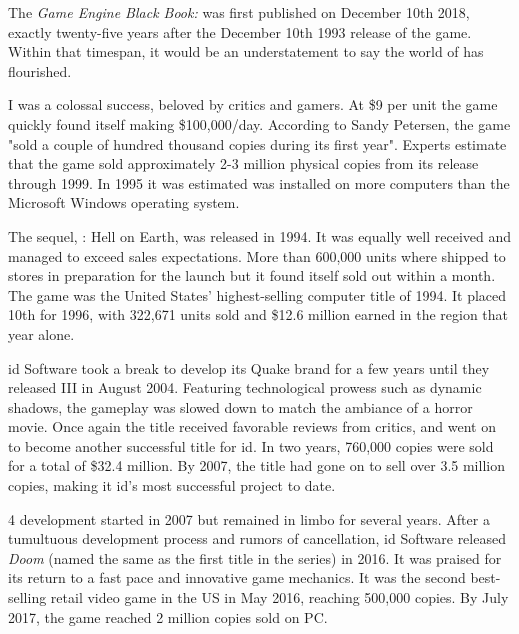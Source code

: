 The \textit{Game Engine Black Book: \doom{}} was first published on December 10th 2018, exactly twenty-five years after the December 10th 1993 release of the game. Within that timespan, it would be an understatement to say the world of \doom{} has flourished.\\
\par
\doom{} I was a colossal success, beloved by critics and gamers. At \$9 per unit the game quickly found itself making \$100,000/day. According to Sandy Petersen, the game "sold a couple of hundred thousand copies during its first year". Experts estimate that the game sold approximately 2-3 million physical copies from its release through 1999. In 1995 it was estimated \doom{} was installed on more computers than the Microsoft Windows operating system.\\
\par
The sequel, \doomii{}: Hell on Earth, was released in 1994. It was equally well received and managed to exceed sales expectations. More than 600,000 units where shipped to stores in preparation for the launch but it found itself sold out within a month. The game was the United States' highest-selling computer title of 1994. It placed 10th for 1996, with 322,671 units sold and \$12.6 million earned in the region that year alone.\\
\par
id Software took a break to develop its Quake brand for a few years until they released \doom{} III in August 2004. Featuring technological prowess such as dynamic shadows, the gameplay was slowed down to match the ambiance of a horror movie. Once again the title received favorable reviews from critics, and went on to become another successful title for id. In two years, 760,000 copies were sold for a total of \$32.4 million.  By 2007, the title had gone on to sell over 3.5 million copies, making it id's most successful project to date.\\
\par
 \doom{} 4 development started in 2007 but remained in limbo for several years. After a tumultuous development process and rumors of cancellation, id Software released \textit{Doom} (named the same as the first title in the series) in 2016. It was praised for its return to a fast pace and innovative game mechanics. It was the second best-selling retail video game in the US in May 2016, reaching 500,000 copies. By July 2017, the game reached 2 million copies sold on PC.\\
\par






